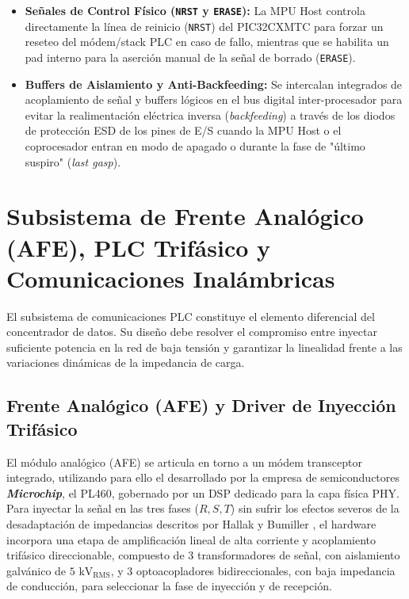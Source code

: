 \begin{itemize}
    \item \textbf{Señales de Control Físico (\texttt{NRST} y \texttt{ERASE}):} La MPU Host controla directamente la línea de reinicio (\texttt{NRST}) del PIC32CXMTC para forzar un reseteo del módem/stack PLC en caso de fallo, mientras que se habilita un pad interno para la aserción manual de la señal de borrado (\texttt{ERASE}).

    \item \textbf{Buffers de Aislamiento y Anti-Backfeeding:} Se intercalan integrados de acoplamiento de señal y buffers lógicos en el bus digital inter-procesador para evitar la realimentación eléctrica inversa (\textit{backfeeding}) a través de los diodos de protección ESD de los pines de E/S cuando la MPU Host o el coprocesador entran en modo de apagado o durante la fase de "último suspiro" (\textit{last gasp}).
\end{itemize}

\section{Subsistema de Frente Analógico (AFE), PLC Trifásico y Comunicaciones Inalámbricas}
\label{sec:afe_plc_rf}

El subsistema de comunicaciones PLC constituye el elemento diferencial del concentrador de datos. Su diseño debe resolver el compromiso entre inyectar suficiente potencia en la red de baja tensión y garantizar la linealidad frente a las variaciones dinámicas de la impedancia de carga.

\subsection{Frente Analógico (AFE) y Driver de Inyección Trifásico}
\label{subsec:afe_driver}

El módulo analógico (AFE) se articula en torno a un módem transceptor integrado, utilizando para ello el desarrollado por la empresa de semiconductores \textbf{\textit{Microchip}}, el PL460, gobernado por un DSP dedicado para la capa física PHY. Para inyectar la señal en las tres fases ($R, S, T$) sin sufrir los efectos severos de la desadaptación de impedancias descritos por Hallak y Bumiller \cite{6525864}, el hardware incorpora una etapa de amplificación lineal de alta corriente y acoplamiento trifásico direccionable, compuesto de 3 transformadores de señal, con aislamiento galvánico de $5\text{ kV}_{\text{RMS}}$, y 3 optoacopladores bidireccionales, con baja impedancia de conducción, para seleccionar la fase de inyección y de recepción.

